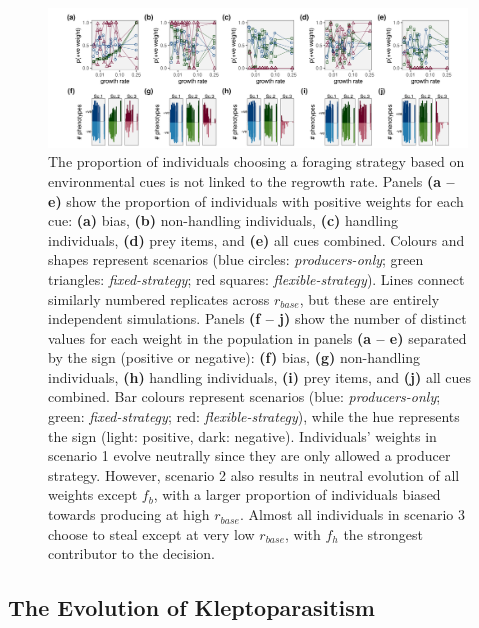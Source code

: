 \documentclass[11pt]{article}
\begin{document}
\begin{figure}[h]
    \centering
    \includegraphics[width=0.99\textwidth]{figures/fig_04_strategy_weight_end_vals.png}
    \caption{
        The proportion of individuals choosing a foraging strategy based on environmental cues is not linked to the regrowth rate.
        Panels \textbf{(a -- e)} show the proportion of individuals with positive weights for each cue: \textbf{(a)} bias, \textbf{(b)} non-handling individuals, \textbf{(c)} handling individuals, \textbf{(d)} prey items, and \textbf{(e)} all cues combined.
        Colours and shapes represent scenarios (blue circles: \textit{producers-only}; green triangles: \textit{fixed-strategy}; red squares: \textit{flexible-strategy}).
        Lines connect similarly numbered replicates across $r_{base}$, but these are entirely independent simulations.
        Panels \textbf{(f -- j)} show the number of distinct values for each weight in the population in panels \textbf{(a -- e)} separated by the sign (positive or negative): \textbf{(f)} bias, \textbf{(g)} non-handling individuals, \textbf{(h)} handling individuals, \textbf{(i)} prey items, and \textbf{(j)} all cues combined.
        Bar colours represent scenarios (blue: \textit{producers-only}; green: \textit{fixed-strategy}; red: \textit{flexible-strategy}), while the hue represents the sign (light: positive, dark: negative).
        Individuals' weights in scenario 1 evolve neutrally since they are only allowed a producer strategy.
        However, scenario 2 also results in neutral evolution of all weights except $f_b$, with a larger proportion of individuals biased towards producing at high $r_{base}$.
        Almost all individuals in scenario 3 choose to steal except at very low $r_{base}$, with $f_h$ the strongest contributor to the decision.
    }
    \label{fig:figure_pipeline}
\end{figure}

\subsection*{The Evolution of Kleptoparasitism}
\end{document}
